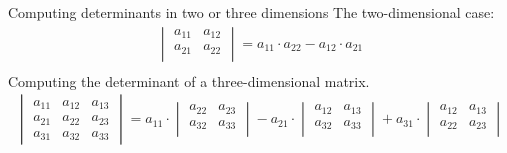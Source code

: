 \documentclass[notes=only]{beamer}
\begin{document}
    \begin{frame}{Computing determinants in two or three dimensions}
      The two-dimensional case:
      \begin{align}
        \begin{vmatrix}
          a_{11} & a_{12} \\
          a_{21} & a_{22} \\
        \end{vmatrix}
        = a_{11} \cdot a_{22} - a_{12} \cdot a_{21} \\
      \end{align}
      Computing the determinant of a three-dimensional matrix.
      \begin{align}
        \begin{vmatrix}
          a_{11} & a_{12} & a_{13}  \\
          a_{21} & a_{22} & a_{23}  \\
          a_{31} & a_{32} & a_{33}
        \end{vmatrix}
        = a_{11} \cdot
         \begin{vmatrix}
          a_{22} & a_{23}   \\
          a_{32} & a_{33}   \\
         \end{vmatrix}  
         -
         a_{21} \cdot
         \begin{vmatrix}
          a_{12} & a_{13}   \\
          a_{32} & a_{33}   \\
         \end{vmatrix}  
        +
         a_{31} \cdot
         \begin{vmatrix}
          a_{12} & a_{13}   \\
          a_{22} & a_{23}   \\
         \end{vmatrix}  
      \end{align}
\end{frame}
\end{document}

